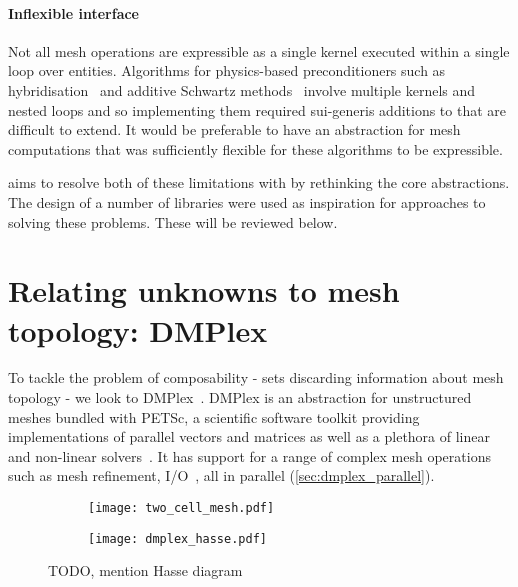 \documentclass[thesis]{subfiles}
\begin{document}
\paragraph{Inflexible interface}{
  Not all mesh operations are expressible as a single kernel executed within a single loop over entities.
  Algorithms for physics-based preconditioners such as hybridisation~\cite{gibsonSlateExtendingFiredrake2020} and additive Schwartz methods~\cite{farrellPCPATCHSoftwareTopological2021} involve multiple kernels and nested loops and so implementing them required sui-generis additions to  that are difficult to extend.
  It would be preferable to have an abstraction for mesh computations that was sufficiently flexible for these algorithms to be expressible.
}

 aims to resolve both of these limitations with  by rethinking the core abstractions.
The design of a number of libraries were used as inspiration for approaches to solving these problems.
These will be reviewed below.

\section{Relating unknowns to mesh topology: DMPlex}
\label{sec:foundations_dmplex}

To tackle the problem of composability - sets discarding information about mesh topology - we look to DMPlex~\cite{knepleyMeshAlgorithmsPDE2009,langeEfficientMeshManagement2016,knepleyUnstructuredOverlappingMesh2015}.
DMPlex is an abstraction for unstructured meshes bundled with PETSc, a scientific software toolkit providing implementations of parallel vectors and matrices as well as a plethora of linear and non-linear solvers~\cite{petsc-web-page,petsc-user-ref,petsc-efficient}.
It has support for a range of complex mesh operations such as mesh refinement, I/O~\cite{hamEfficientNtoMCheckpointing2024}, all in parallel (\cref{sec:dmplex_parallel}).  %

\begin{figure}
  \centering
  \begin{subfigure}{.49\textwidth}
    \centering
    \texttt{[image: two\_cell\_mesh.pdf]}
  \end{subfigure}
  \begin{subfigure}{.49\textwidth}
    \centering
    \texttt{[image: dmplex\_hasse.pdf]}
  \end{subfigure}
  \caption{TODO, mention Hasse diagram}
  \label{fig:dmplex_hasse}
\end{figure}
\end{document}

